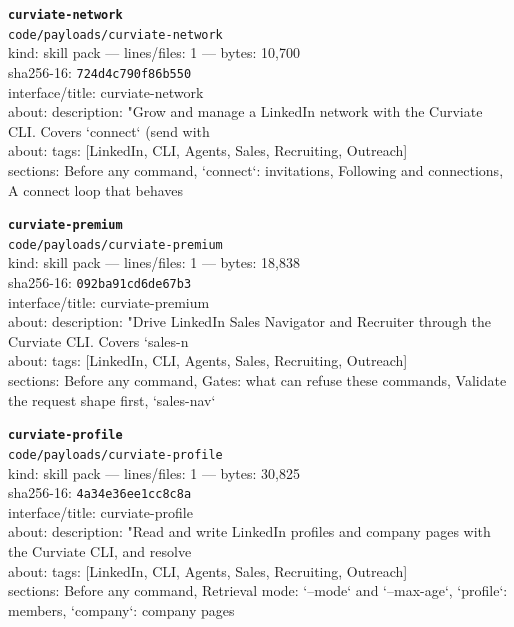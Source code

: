 \noindent\textbf{\texttt{curviate-network}}\\
\texttt{code/payloads/curviate-network}\\
kind: skill pack --- lines/files: 1 --- bytes: 10,700\\
sha256-16: \texttt{724d4c790f86b550}\\
interface/title: curviate-network\\
about: description: "Grow and manage a LinkedIn network with the Curviate CLI. Covers `connect` (send with \\
about: tags: [LinkedIn, CLI, Agents, Sales, Recruiting, Outreach]\\
sections: Before any command, `connect`: invitations, Following and connections, A connect loop that behaves\\
\vspace*{6.0pt}

\noindent\textbf{\texttt{curviate-premium}}\\
\texttt{code/payloads/curviate-premium}\\
kind: skill pack --- lines/files: 1 --- bytes: 18,838\\
sha256-16: \texttt{092ba91cd6de67b3}\\
interface/title: curviate-premium\\
about: description: "Drive LinkedIn Sales Navigator and Recruiter through the Curviate CLI. Covers `sales-n\\
about: tags: [LinkedIn, CLI, Agents, Sales, Recruiting, Outreach]\\
sections: Before any command, Gates: what can refuse these commands, Validate the request shape first, `sales-nav`\\
\vspace*{6.0pt}

\noindent\textbf{\texttt{curviate-profile}}\\
\texttt{code/payloads/curviate-profile}\\
kind: skill pack --- lines/files: 1 --- bytes: 30,825\\
sha256-16: \texttt{4a34e36ee1cc8c8a}\\
interface/title: curviate-profile\\
about: description: "Read and write LinkedIn profiles and company pages with the Curviate CLI, and resolve \\
about: tags: [LinkedIn, CLI, Agents, Sales, Recruiting, Outreach]\\
sections: Before any command, Retrieval mode: `--mode` and `--max-age`, `profile`: members, `company`: company pages\\
\vspace*{6.0pt}
\newpage

